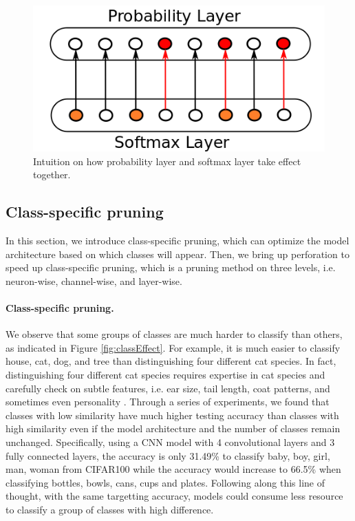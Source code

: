 \documentclass[pageno]{jpaper}
\begin{document}
\begin{figure}
  \centering
  \includegraphics[width=.45\textwidth]{intuition.png}
\caption{Intuition on how probability layer and softmax layer take effect together.}
  \label{fig:intuition}

\end{figure}




\subsection{Class-specific pruning}
In this section, we introduce class-specific pruning, which can optimize the model architecture based on which classes will appear. Then, we bring up perforation to speed up class-specific pruning, which is a pruning method on three levels, i.e. neuron-wise, channel-wise, and layer-wise.


\paragraph{Class-specific pruning.} 
We observe that some groups of classes are much harder to classify than others, as indicated in Figure \ref{fig:classEffect}. For example, it is much easier to classify house, cat, dog, and tree than distinguishing four different cat species. In fact, distinguishing four different cat species requires expertise in cat species and carefully check on subtle features, i.e. ear size, tail length, coat patterns, and sometimes even personality \cite{cat2018}. Through a series of experiments, we found that classes with low similarity have much higher testing accuracy than classes with high similarity even if the model architecture and the number of classes remain unchanged. Specifically, using a CNN model with 4 convolutional layers and 3 fully connected layers, the accuracy is only 31.49\% to classify baby, boy, girl, man, woman from CIFAR100 while the accuracy would increase to 66.5\% when classifying bottles, bowls, cans, cups and plates. Following along this line of thought, with the same targetting accuracy, models could consume less resource to classify a group of classes with high difference. 
\end{document}
